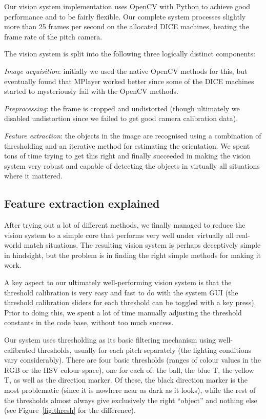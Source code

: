 \documentclass[12pt,a4paper,notitlepage,twocolumn]{report}
\begin{document}
Our vision system implementation uses OpenCV with Python to achieve
good performance and to be fairly flexible. Our complete system
processes slightly more than 25 frames per second on the allocated
DICE machines, beating the frame rate of the pitch camera.

The vision system is split into the following three logically distinct
components:

{\em Image acquisition}: initially we used the native OpenCV methods
for this, but eventually found that MPlayer worked better since some
of the DICE machines started to mysteriously fail with the OpenCV
methods.

{\em Preprocessing}: the frame is cropped and undistorted (though
ultimately we disabled undistortion since we failed to get good camera
calibration data).

{\em Feature extraction}: the objects in the image are recognised
using a combination of thresholding and an iterative method for
estimating the orientation. We spent tons of time trying to get this
right and finally succeeded in making the vision system very robust
and capable of detecting the objects in virtually all situations where
it mattered.

\subsection*{Feature extraction explained}
After trying out a lot of different methods, we finally managed to
reduce the vision system to a simple core that performs very well
under virtually all real-world match situations. The resulting vision
system is perhaps deceptively simple in hindsight, but the problem is
in finding the right simple methods for making it work.

A key aspect to our ultimately well-performing vision system is that
the threshold calibration is very easy and fast to do with the system
GUI (the threshold calibration sliders for each threshold can be
toggled with a key press). Prior to doing this, we spent a lot of time
manually adjusting the threshold constants in the code base, without
too much success.

Our system uses thresholding as its basic filtering mechanism using
well-calibrated thresholds, usually for each pitch separately (the
lighting conditions vary considerably). There are four basic
thresholds (ranges of colour values in the RGB or the HSV colour
space), one for each of: the ball, the blue T, the yellow T, as well
as the direction marker. Of these, the black direction marker is the
most problematic (since it is nowhere near as dark as it looks), while
the rest of the thresholds almost always give exclusively the right
“object” and nothing else (see Figure~\ref{fig:thresh} for the difference).
\end{document}
